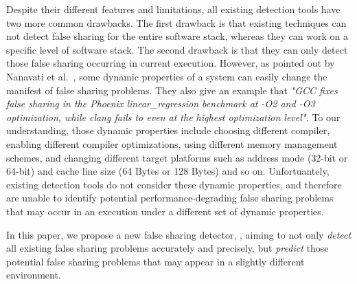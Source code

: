 Despite their different features and limitations, all existing detection tools 
have two more common drawbacks.
The first drawback is that existing techniques can not detect false sharing for 
the entire software stack, whereas they can work on a specific level of software stack.
The second drawback is that they can only detect those false sharing occurring in current execution.
However, as pointed out by Nanavati et al.~\cite{OSdetection}, 
some dynamic properties of a system can easily 
change the manifest of false sharing problems.
They also give an example that 
{\it "GCC fixes false sharing in the Phoenix linear\_regression benchmark 
at -O2 and -O3 optimization, while clang fails to even at the highest
optimization level".}
To our understanding, those dynamic properties include 
choosing different compiler, 
enabling different compiler optimizations, 
using different memory management schemes,
and changing different target platforms such as address mode (32-bit or 64-bit) and cache line
size (64 Bytes or 128 Bytes) and so on. Unfortuantely, 
existing detection tools do not consider these dynamic properties, and
therefore are unable to identify potential performance-degrading false
sharing problems that may occur in an execution under a different set of 
dynamic properties.

In this paper, we propose a new false sharing detector, , aiming to
not only {\it detect} all existing false sharing problems accurately and precisely,
but {\it predict} those potential 
false sharing problems that may appear in a slightly different environment. 

